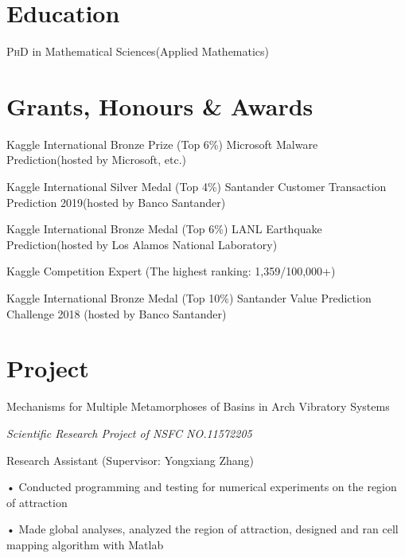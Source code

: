 \documentclass[11pt]{article}
\begin{document}
\section*{Education}
\textsc{PhD} in Mathematical Sciences(Applied Mathematics) 


\section*{Grants, Honours \& Awards}

Kaggle International Bronze Prize (Top 6\%) Microsoft Malware Prediction(hosted by Microsoft, etc.)

Kaggle International Silver Medal (Top 4\%) Santander Customer Transaction Prediction 2019(hosted by Banco Santander)

Kaggle International Bronze Medal (Top 6\%) LANL Earthquake Prediction(hosted by Los Alamos National Laboratory)

 Kaggle Competition Expert (The highest ranking: 1,359/100,000+)

 Kaggle International Bronze Medal (Top 10\%) Santander Value Prediction Challenge 2018 (hosted by Banco Santander)


\section*{Project}
Mechanisms for Multiple Metamorphoses of Basins in Arch Vibratory Systems 

\emph{Scientific Research Project of NSFC NO.11572205} 

Research Assistant (Supervisor: Yongxiang Zhang)

• Conducted programming and testing for numerical experiments on the region of attraction 

• Made global analyses, analyzed the region of attraction, designed and ran cell mapping algorithm with Matlab
\end{document}
